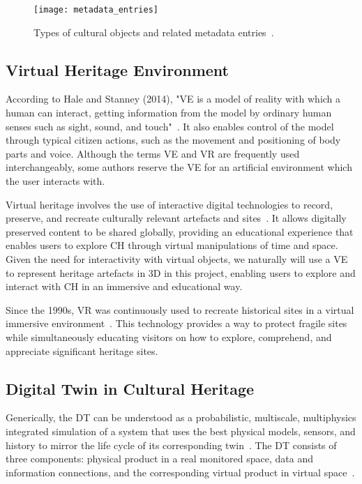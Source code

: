 \begin{figure}[h!]
    \centering
    \texttt{[image: metadata\_entries]}
    \caption{Types of cultural objects and related metadata entries~\cite{Windhager2019Visualization}.}
    \label{fig:ch_objects}
\end{figure}
\FloatBarrier


\subsection{Virtual Heritage Environment}
\label{sec:virtual_heritage}

According to Hale and Stanney (2014), "\gls{VE} is a model of reality with which a human can interact, getting information 
from the model by ordinary human senses such as sight, sound, and touch"~\cite{hale2014handbook}. 
It also enables control of the model through typical citizen actions, such as the movement and positioning of body parts and voice. 
Although the terms \gls{VE} and \gls{VR} are frequently used interchangeably, some authors reserve the \gls{VE} for an artificial environment which the user interacts with.

Virtual heritage involves the use of interactive digital technologies to record, preserve, and recreate 
culturally relevant artefacts and sites~\cite{848434}. It allows digitally preserved content to be shared globally, providing an educational experience that enables users to explore \gls{CH} through virtual manipulations of time and space. 
Given the need for interactivity with virtual objects, we naturally will use a \gls{VE} to represent heritage artefacts 
in \gls{3D} in this project, enabling users to explore and interact with \gls{CH} in an immersive and educational way.

Since the 1990s, \gls{VR} was continuously used to recreate historical sites in a virtual immersive environment~\cite{hale2014handbook}. 
This technology provides a way to protect fragile sites while simultaneously educating visitors on how to explore, comprehend, and appreciate significant heritage sites.

\subsection{Digital Twin in Cultural Heritage}
\label{sec:digital_twin}


Generically, the \gls{DT} can be understood as a probabilistic, multiscale,
multiphysics integrated simulation of a system that uses the best physical models,
sensors, and history to mirror the life cycle of its corresponding twin~\cite{dezen2020towards}.
The \gls{DT} consists of three components: physical product in a real monitored
space, data and information connections, and the corresponding virtual product
in virtual space~\cite{grieves2017digital}.


